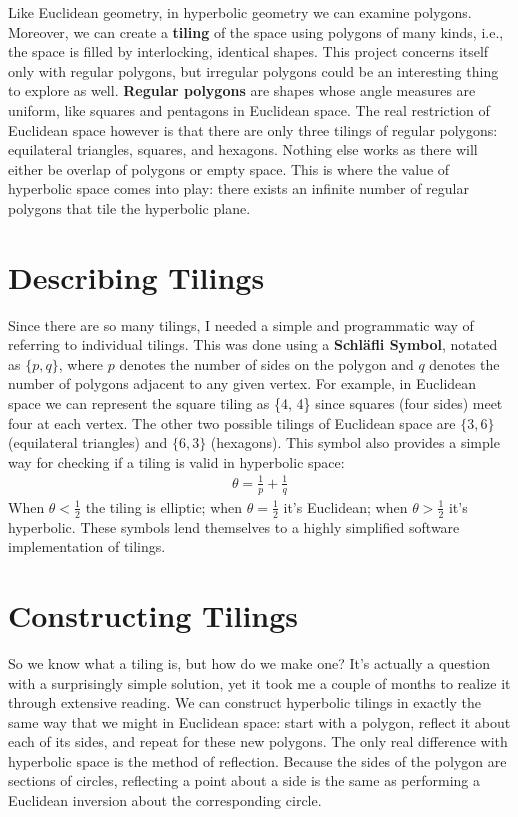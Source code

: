 \documentclass[letterpaper,12pt]{article}
\begin{document}
Like Euclidean geometry, in hyperbolic geometry we can examine polygons. Moreover, we can create a \textbf{tiling} of the space using polygons of many kinds, i.e., the space is filled by interlocking, identical shapes. This project concerns itself only with regular polygons, but irregular polygons could be an interesting thing to explore as well. \textbf{Regular polygons} are shapes whose angle measures are uniform, like squares and pentagons in Euclidean space. The real restriction of Euclidean space however is that there are only three tilings of regular polygons: equilateral triangles, squares, and hexagons. Nothing else works as there will either be overlap of polygons or empty space. This is where the value of hyperbolic space comes into play: there exists an infinite number of regular polygons that tile the hyperbolic plane.

\section*{Describing Tilings}

Since there are so many tilings, I needed a simple and programmatic way of referring to individual tilings. This was done using a \textbf{Schl{\"a}fli Symbol}, notated as $\{p, q\}$, where $p$ denotes the number of sides on the polygon and $q$ denotes the number of polygons adjacent to any given vertex. For example, in Euclidean space we can represent the square tiling as \{4, 4\} since squares (four sides) meet four at each vertex. The other two possible tilings of Euclidean space are $\{3, 6\}$ (equilateral triangles) and $\{6, 3\}$ (hexagons). This symbol also provides a simple way for checking if a tiling is valid in hyperbolic space:
\begin{gather*}
\theta=\frac{1}{p} + \frac{1}{q}
\end{gather*}
When $\theta<\frac{1}{2}$ the tiling is elliptic; when $\theta=\frac{1}{2}$ it's Euclidean; when $\theta>\frac{1}{2}$ it's hyperbolic.  These symbols lend themselves to a highly simplified software implementation of tilings.

\section*{Constructing Tilings}

So we know what a tiling is, but how do we make one? It's actually a question with a surprisingly simple solution, yet it took me a couple of months to realize it through extensive reading. We can construct hyperbolic tilings in exactly the same way that we might in Euclidean space: start with a polygon, reflect it about each of its sides, and repeat for these new polygons. The only real difference with hyperbolic space is the method of reflection. Because the sides of the polygon are sections of circles, reflecting a point about a side is the same as performing a Euclidean inversion about the corresponding circle.
\end{document}
